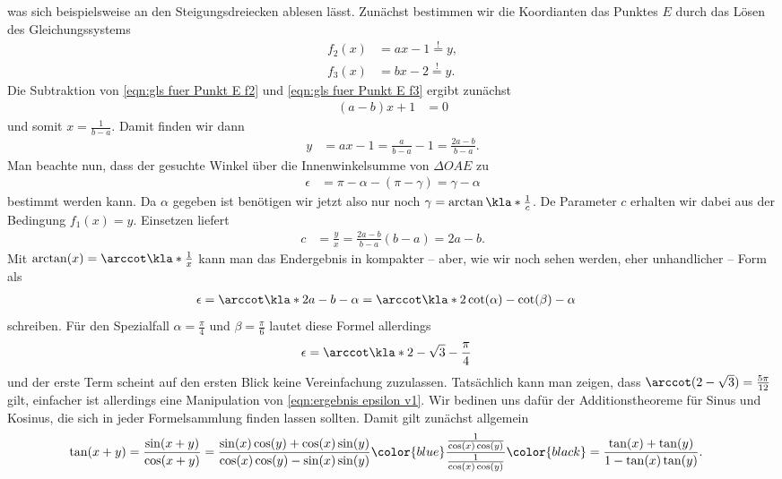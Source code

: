 \documentclass[english, parskip=full]{scrartcl}
\begin{document}
was sich beispielsweise an den Steigungsdreiecken ablesen lässt.
Zunächst bestimmen wir die Koordianten das Punktes $E$ durch das Lösen des Gleichungssystems
\begin{align}
f_2(x) &= ax - 1 \overset{!}{=} y,\label{eqn:gls fuer Punkt E f2}\\
f_3(x) &= bx - 2 \overset{!}{=} y\label{eqn:gls fuer Punkt E f3}.
\end{align}
Die Subtraktion von \autoref{eqn:gls fuer Punkt E f2} und \autoref{eqn:gls fuer Punkt E f3} ergibt zunächst
\begin{align}
(a-b)x +1 &= 0
\end{align}
und somit $x= \frac{1}{b - a}$.
Damit finden wir dann
\begin{align}
y &= ax - 1 = \frac{a}{b-a} - 1 = \frac{2a - b}{b - a}.
\end{align}
Man beachte nun, dass der gesuchte Winkel über die Innenwinkelsumme von $\Delta OAE$ zu
\begin{align}
\epsilon &= \pi - \alpha - (\pi - \gamma) = \gamma - \alpha
\end{align}
bestimmt werden kann.
Da $\alpha$ gegeben  ist benötigen wir jetzt also nur noch $\gamma = \arctan \kla*{\frac{1}{c}}$.
De Parameter $c$ erhalten wir dabei aus der Bedingung $f_1(x) = y$.
Einsetzen liefert
\begin{align}
c &= \frac{y}{x} = \frac{2a-b}{b-a} (b-a) = 2a-b.
\end{align}
Mit $\arctan(x) = \arccot\kla*{\frac{1}{x}}$ kann man das Endergebnis in kompakter -- aber, wie wir noch sehen werden, eher unhandlicher -- Form als
\begin{align}
\epsilon &= \arccot \kla*{2a-b} - \alpha = \arccot\kla*{2\cot(\alpha) - \cot(\beta)} - \alpha \label{eqn:ergebnis epsilon v1}
\end{align}
schreiben.
Für den Spezialfall $\alpha = \frac{\pi}{4}$ und $\beta = \frac{\pi}{6}$ lautet diese Formel allerdings
\begin{align}
\epsilon &= \arccot\kla*{2 - \sqrt{3}} - \frac{\pi}{4}
\end{align}
und der erste Term scheint auf den ersten Blick keine Vereinfachung zuzulassen. 
Tatsächlich kann man zeigen, dass $\arccot(2-\sqrt{3}) = \frac{5\pi}{12}$ gilt, einfacher ist allerdings eine Manipulation von \autoref{eqn:ergebnis epsilon v1}.
Wir bedinen uns dafür der Additionstheoreme für Sinus und Kosinus, die sich in jeder Formelsammlung finden lassen sollten.
Damit gilt zunächst allgemein
\begin{align}
\tan(x+y) &= \frac{\sin(x+y)}{\cos(x+y)} = \frac{\sin(x) \cos(y) + \cos(x) \sin(y)}{\cos(x) \cos(y) - \sin(x) \sin(y)} \color{blue} \frac{\frac{1}{\cos(x)\cos(y)}}{\frac{1}{\cos(x)\cos(y)}} \color{black} = \frac{\tan(x) + \tan(y)}{1 - \tan(x)\tan(y)}. \label{eqn:additionstheorem tan}
\end{align}
\end{document}
